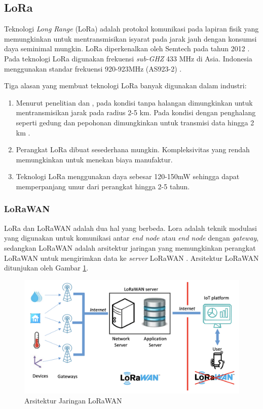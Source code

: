 \iffalse
\subsection{LoRa}
Teknologi \textit{Long Range} (LoRa) adalah protokol komunikasi pada lapiran fisik yang memungkinkan untuk mentransmisikan isyarat pada jarak jauh dengan konsumsi daya seminimal mungkin. LoRa diperkenalkan oleh Semtech pada tahun 2012 \cite{Oliveira2017}. Pada teknologi LoRa digunakan frekuensi \textit{sub-GHZ} 433 MHz di Asia. Indonesia menggunakan standar frekuensi 920-923MHz (AS923-2) \cite{LoRa2020}.

Tiga alasan yang membuat teknologi LoRa banyak digunakan dalam industri:

\begin{enumerate}
	\item Menurut penelitian \cite{Petajajarvi2016} dan \cite{Haxhibeqiri2017}, pada kondisi tanpa halangan dimungkinkan untuk mentransmisikan jarak pada radius 2-5 km. Pada kondisi dengan penghalang seperti gedung dan pepohonan dimungkinkan untuk transmisi data hingga 2 km \cite{Rida2019}.
	\item Perangkat LoRa dibuat sesederhana mungkin. Kompleksivitas yang rendah memungkinkan untuk menekan biaya manufaktur.
	\item Teknologi LoRa menggunakan daya sebesar 120-150mW sehingga dapat memperpanjang umur dari perangkat hingga 2-5 tahun.
\end{enumerate}

\subsubsection{LoRaWAN}
LoRa dan LoRaWAN adalah dua hal yang berbeda. Lora adalah teknik modulasi yang digunakan untuk komunikasi antar \textit{end node} atau \textit{end node} dengan \textit{gateway}, sedangkan LoRaWAN adalah arsitektur jaringan yang memungkinkan perangkat LoRaWAN untuk mengirimkan data ke \textit{server} LoRaWAN \cite{Zhou2019}. Arsitektur LoRaWAN ditunjukan oleh Gambar \ref{Fig: lorawan-architecure}.
\begin{figure}[ht]
	\centering
	\includegraphics[width=13cm]{contents/chapter-2/lorawan-architecture.png}
	\caption{Arsitektur Jaringan LoRaWAN \cite{Montagny2022}}
	\label{Fig: lorawan-architecure}
\end{figure}

